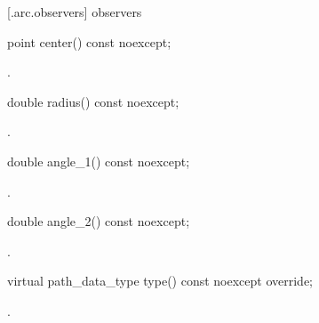  [\iotwod.arc.observers]{ observers}

\begin{itemdecl}
    point center() const noexcept;
\end{itemdecl}
\begin{itemdescr}
	\pnum
	\returns
	.

\end{itemdescr}

\begin{itemdecl}
    double radius() const noexcept;
\end{itemdecl}
\begin{itemdescr}
	\pnum
	\returns
	.

\end{itemdescr}

\begin{itemdecl}
    double angle_1() const noexcept;
\end{itemdecl}
\begin{itemdescr}
	\pnum
	\returns
	.

\end{itemdescr}

\begin{itemdecl}
    double angle_2() const noexcept;
\end{itemdecl}
\begin{itemdescr}
	\pnum
	\returns
	.

\end{itemdescr}

\begin{itemdecl}
    virtual path_data_type type() const noexcept override;
\end{itemdecl}
\begin{itemdescr}
	\pnum
	\returns
	.

\end{itemdescr}
